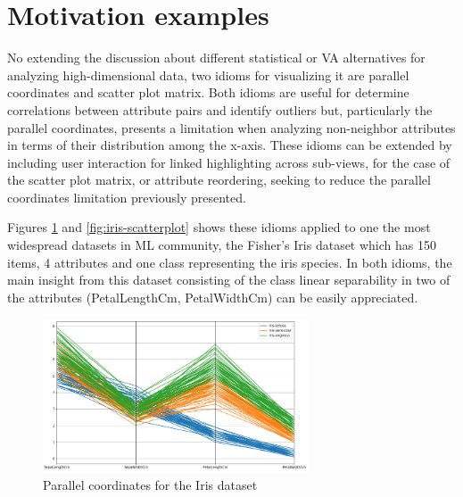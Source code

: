 \section{Motivation examples} %
\label{section1.1}

No extending the discussion about different statistical or VA alternatives for analyzing high-dimensional data, two idioms for visualizing it are parallel coordinates and scatter plot matrix. Both idioms are useful for determine correlations between attribute pairs and identify outliers but, particularly the parallel coordinates, presents a limitation when analyzing non-neighbor attributes in terms of their distribution among the x-axis. These idioms can be extended by including user interaction for linked highlighting across sub-views, for the case of the scatter plot matrix, or attribute reordering, seeking to reduce the parallel coordinates limitation previously presented.

Figures \ref{fig:iris-parallel} and \ref{fig:iris-scatterplot} shows these idioms applied to one the most widespread datasets in ML community, the Fisher's Iris dataset \cite{FisherIris} which has 150 items, 4 attributes and one class representing the iris species. In both idioms, the main insight from this dataset consisting of the class linear separability in two of the attributes (PetalLengthCm, PetalWidthCm) can be easily appreciated.

\begin{figure}[ht]
 \centering
 \includegraphics[width=0.7\textwidth]{iris-parallel.png}
 \caption{Parallel coordinates for the Iris dataset \cite{FisherIris}}
 \label{fig:iris-parallel}
\end{figure}

